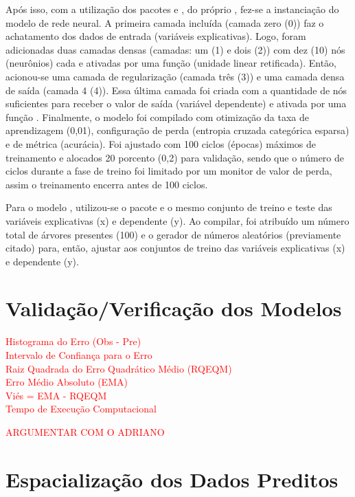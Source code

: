 \indent Após isso, com a utilização dos pacotes \cite{tensorflow_2015_whitepaper} e  \cite{keras_2015_chollet}, do próprio , fez-se a instanciação do modelo de rede neural. A primeira camada incluída (camada zero (0)) faz o achatamento dos dados de entrada (variáveis explicativas). Logo, foram adicionadas duas camadas densas (camadas: um (1) e dois (2)) com dez (10) nós (neurônios) cada e ativadas por uma função  (unidade linear retificada). Então, acionou-se uma camada de regularização (camada três (3)) e uma camada densa de saída (camada 4 (4)). Essa última camada foi criada com a quantidade de nós suficientes para receber o valor de saída (variável dependente) e ativada por uma função . Finalmente, o modelo foi compilado com otimização da taxa de aprendizagem (0,01), configuração de perda (entropia cruzada categórica esparsa) e de métrica (acurácia). Foi ajustado com 100 ciclos (épocas) máximos de treinamento e alocados 20 porcento (0,2) para validação, sendo que o número de ciclos durante a fase de treino foi limitado por um monitor de valor de perda, assim o treinamento encerra antes de 100 ciclos.

\indent Para o modelo , utilizou-se o pacote  e o mesmo conjunto de treino e teste das variáveis explicativas (x) e dependente (y). Ao compilar, foi atribuído um número total de árvores presentes (100) e o gerador de números aleatórios (previamente citado) para, então, ajustar aos conjuntos de treino das variáveis explicativas (x) e dependente (y).


\section{Validação/Verificação dos Modelos}

\indent \textcolor{red}{Histograma do Erro (Obs - Pre)\\
\indent Intervalo de Confiança para o Erro\\
\indent Raiz Quadrada do Erro Quadrático Médio (RQEQM)\\
\indent Erro Médio Absoluto (EMA)\\
\indent Viés = EMA - RQEQM\\
\indent Tempo de Execução Computacional}

\indent \textcolor{red}{ARGUMENTAR COM O ADRIANO}

\section{Espacialização dos Dados Preditos}

